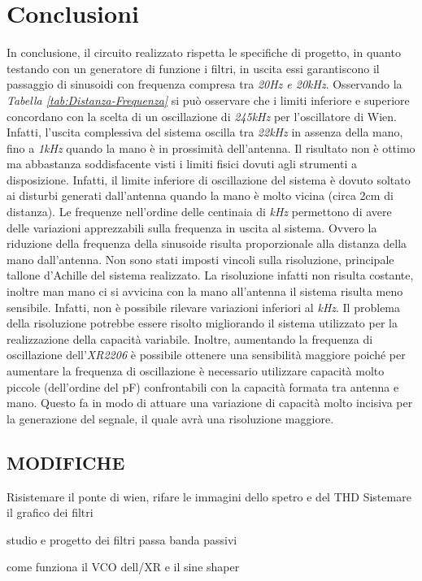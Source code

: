 \documentclass[titlepage]{report}
\begin{document}
\chapter{Conclusioni}
 	\label{ch:Conclusioni}
	In conclusione, il circuito realizzato rispetta le specifiche di progetto, in quanto testando con un generatore di funzione i filtri, in uscita essi garantiscono il passaggio di sinusoidi con frequenza compresa tra \textit{20Hz e 20kHz}. Osservando la \textit{Tabella \ref{tab:Distanza-Frequenza}} si può osservare che i limiti inferiore e superiore concordano con la scelta di un oscillazione di \textit{245kHz} per l'oscillatore di Wien. Infatti, l'uscita complessiva del sistema oscilla tra \textit{22kHz} in assenza della mano, fino a \textit{1kHz} quando la mano è in prossimità dell'antenna. Il risultato non è ottimo ma abbastanza soddisfacente visti i limiti fisici dovuti agli strumenti a disposizione. Infatti, il limite inferiore di oscillazione del sistema è dovuto soltato ai disturbi generati dall'antenna quando la mano è molto vicina (circa 2cm di distanza). Le frequenze nell'ordine delle centinaia di \textit{kHz} permettono di avere delle variazioni apprezzabili sulla frequenza in uscita al sistema. Ovvero la riduzione della frequenza della sinusoide risulta proporzionale alla distanza della mano dall'antenna.
	Non sono stati imposti vincoli sulla risoluzione, principale tallone d'Achille del sistema realizzato. La risoluzione infatti non risulta costante, inoltre man mano ci si avvicina con la mano all'antenna il sistema risulta meno sensibile. Infatti, non è possibile rilevare variazioni inferiori al \textit{kHz}.
	Il problema della risoluzione potrebbe essere risolto migliorando il sistema utilizzato per la realizzazione della capacità variabile. Inoltre, aumentando la frequenza di oscillazione dell'\textit{XR2206} è possibile ottenere una sensibilità maggiore poiché per aumentare la frequenza di oscillazione è necessario utilizzare capacità molto piccole (dell'ordine del pF) confrontabili con la capacità formata tra antenna e mano. Questo fa in modo di attuare una variazione di capacità molto incisiva per la generazione del segnale, il quale avrà una risoluzione maggiore.
	\newpage
	

	\section{MODIFICHE}
	Risistemare il ponte di wien, rifare le immagini dello spetro e del THD
	Sistemare il grafico dei filtri

	studio e progetto dei filtri passa banda passivi

	come funziona il VCO dell/XR e il sine shaper

	\listoffigures
	\listoftables
\end{document}

